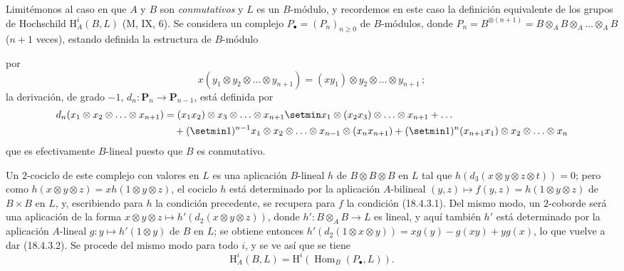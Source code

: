 \begin{env}[18.4.4]
\label{0.18.4.4-es}
Limitémonos al caso en que $A$ y $B$ son \emph{conmutativos} y $L$ es un
$B$-módulo, y recordemos en este caso la definición equivalente de los grupos
de Hochschild $\mathrm H_A^i(B,L)$ (M, IX, 6). Se considera un complejo
$P_\bullet=(P_n)_{n\geqslant0}$ de $B$-módulos, donde
$P_n=B^{\otimes(n+1)}=B\otimes_A B\otimes_A\ldots\otimes_A B$
($n+1$ veces), estando definida la estructura de $B$-módulo


por
\[
  x(y_1\otimes y_2\otimes\ldots\otimes y_{n+1})
  =(xy_1)\otimes y_2\otimes\ldots\otimes y_{n+1}\,;
\]
la derivación, de grado $-1$, $d_n:\mathbf P_n\to\mathbf P_{n-1}$, está
definida por
\begin{align*}
  d_n(x_1\otimes x_2\otimes\ldots\otimes x_{n+1})
    &=(x_1x_2)\otimes x_3\otimes\ldots\otimes x_{n+1}
      \setmin x_1\otimes(x_2x_3)\otimes\ldots\otimes x_{n+1}+\ldots\\
    &\quad+(\setmin 1)^{n-1}x_1\otimes x_2\otimes\ldots\otimes x_{n-1}
      \otimes(x_nx_{n+1})
      +(\setmin 1)^n(x_{n+1}x_1)\otimes x_2\otimes\ldots\otimes x_n
\end{align*}
que es efectivamente $B$-lineal puesto que $B$ es conmutativo.

Un $2$-cociclo de este complejo con valores en $L$ es una aplicación
$B$-lineal $h$ de $B\otimes B\otimes B$ en $L$ tal que
$h(d_3(x\otimes y\otimes z\otimes t))=0$; pero como
$h(x\otimes y\otimes z)=xh(1\otimes y\otimes z)$, el cociclo $h$ está
determinado por la aplicación $A$-bilineal
$(y,z)\longmapsto f(y,z)=h(1\otimes y\otimes z)$ de $B\times B$ en $L$, y,
escribiendo para $h$ la condición precedente, se recupera para $f$ la
condición (18.4.3.1). Del mismo modo, un $2$-coborde será una aplicación de la
forma $x\otimes y\otimes z\longmapsto h'(d_2(x\otimes y\otimes z))$, donde
$h':B\otimes_A B\to L$ es lineal, y aquí también $h'$ está determinado por la
aplicación $A$-lineal $g:y\longmapsto h'(1\otimes y)$ de $B$ en $L$; se
obtiene entonces
$h'(d_2(1\otimes x\otimes y))=xg(y)-g(xy)+yg(x)$, lo que vuelve a dar
(18.4.3.2). Se procede del mismo modo para todo $i$, y se ve así que se tiene
\begin{equation}
\label{0.18.4.4.1-es}
\tag{18.4.4.1}
  \mathrm H_A^i(B,L)=\mathrm H^i(\operatorname{Hom}_B(P_\bullet,L)).
\end{equation}
\end{env}

